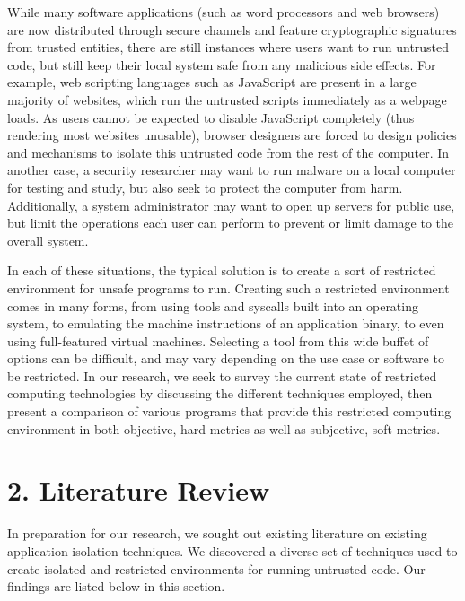 \documentclass{proc}
\begin{document}
While many software applications (such as word processors and web browsers) are now distributed through secure channels and feature cryptographic signatures from trusted entities, there are still instances where users want to run untrusted code, but still keep their local system safe from any malicious side effects. For example, web scripting languages such as JavaScript are present in a large majority of websites, which run the untrusted scripts immediately as a webpage loads. As users cannot be expected to disable JavaScript completely (thus rendering most websites unusable), browser designers are forced to design policies and mechanisms to isolate this untrusted code from the rest of the computer. In another case, a security researcher may want to run malware on a local computer for testing and study, but also seek to protect the computer from harm. Additionally, a system administrator may want to open up servers for public use, but limit the operations each user can perform to prevent or limit damage to the overall system.

In each of these situations, the typical solution is to create a sort of restricted environment for unsafe programs to run. Creating such a restricted environment comes in many forms, from using tools and syscalls built into an operating system, to emulating the machine instructions of an application binary, to even using full-featured virtual machines. Selecting a tool from this wide buffet of options can be difficult, and may vary depending on the use case or software to be restricted. In our research, we seek to survey the current state of restricted computing technologies by discussing the different techniques employed, then present a comparison of various programs that provide this restricted computing environment in both objective, hard metrics as well as subjective, soft metrics.

\section*{2. Literature Review}

In preparation for our research, we sought out existing literature on existing application isolation techniques. We discovered a diverse set of techniques used to create isolated and restricted environments for running untrusted code. Our findings are listed below in this section.
\end{document}
